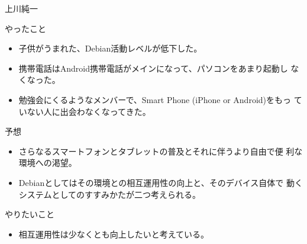 \begin{prework}{ 上川純一 }

やったこと
\begin{itemize}
 \item 子供がうまれた、Debian活動レベルが低下した。
 \item 携帯電話はAndroid携帯電話がメインになって、パソコンをあまり起動し
       なくなった。
 \item 勉強会にくるようなメンバーで、Smart Phone (iPhone or Android)をもっ
       ていない人に出会わなくなってきた。
\end{itemize}
予想
\begin{itemize}
 \item さらなるスマートフォンとタブレットの普及とそれに伴うより自由で便
       利な環境への渇望。
 \item Debianとしてはその環境との相互運用性の向上と、そのデバイス自体で
       動くシステムとしてのすすみかたが二つ考えられる。
\end{itemize}
やりたいこと
\begin{itemize}
 \item 相互運用性は少なくとも向上したいと考えている。
\end{itemize}
\end{prework}


